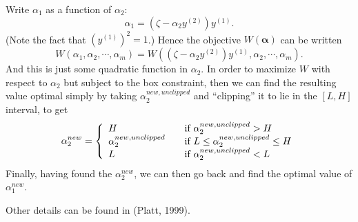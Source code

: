 \documentclass[a4paper]{report}
\newcommand{\bs}{\boldsymbol}
\begin{document}
Write $\alpha_1$ as a function of $\alpha_2$:
\begin{equation}
	\alpha_1 = (\zeta - \alpha_2 y^{(2)})y^{(1)}.
\end{equation}
(Note the fact that $(y^{(1)})^2=1$.) Hence the objective $W(\bs{\alpha})$ can be written
\begin{equation}
	W(\alpha_1,\alpha_2,\cdots,\alpha_m) = W((\zeta - \alpha_2 y^{(2)})y^{(1)},\alpha_2,\cdots,\alpha_m).
\end{equation}
And this is just some quadratic function in $\alpha_2$. In order to maximize $W$ with respect to $\alpha_2$ but subject to the box constraint, then we can find the resulting value optimal simply by taking $\alpha_2^{new,unclipped}$ and ``clipping'' it to lie in the $[L,H]$ interval, to get
\begin{equation}
	\alpha_2^{new} =  \left\{ 
	  \begin{array}{l l}
	    H & \quad \text{if $\alpha_2^{new,unclipped} > H$}\\
	    \alpha_2^{new, unclipped} & \quad \text{if $L \leq \alpha_2^{new,unclipped} \leq H$}\\
	    L &\quad \text{if $\alpha_2 ^{new,unclipped} < L$} 
	  \end{array} \right.
\end{equation}
Finally, having found the $\alpha_2^{new}$, we can then go back and find the optimal value of $\alpha_1^{new}$.

Other details can be found in (Platt, 1999).
\end{document}
